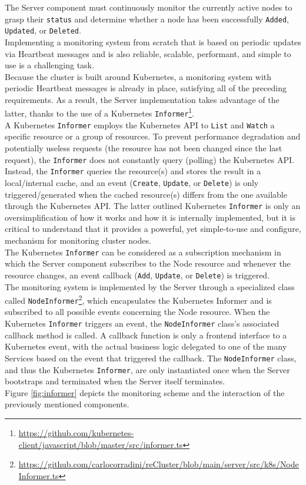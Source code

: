 The Server component must continuously monitor the currently active nodes to
grasp their \texttt{status} and determine whether a node has been successfully \texttt{Added},
\texttt{Updated}, or \texttt{Deleted}. \\ %
Implementing a monitoring system from scratch that is based on periodic updates
via Heartbeat messages and is also reliable, scalable, performant, and simple to
use is a challenging task. \\ %
Because the cluster is built around Kubernetes, a monitoring system with
periodic Heartbeat messages is already in place, satisfying all of the preceding
requirements. As a result, the Server implementation takes advantage of the latter,
thanks to the use of a Kubernetes \texttt{Informer}\footnote{\url{https://github.com/kubernetes-client/javascript/blob/master/src/informer.ts}}.
\\ %
A Kubernetes \texttt{Informer} employs the Kubernetes API to \texttt{List} and \texttt{Watch}
a specific resource or a group of resources. To prevent performance degradation and
potentially useless requests (the resource has not been changed since the last
request), the \texttt{Informer} does not constantly query (polling) the Kubernetes
API. Instead, the \texttt{Informer} queries the resource(s) and stores the result
in a local/internal cache, and an event (\texttt{Create}, \texttt{Update}, or \texttt{Delete})
is only triggered/generated when the cached resource(s) differs from the one
available through the Kubernetes API. The latter outlined Kubernetes \texttt{Informer}
is only an oversimplification of how it works and how it is internally
implemented, but it is critical to understand that it provides a powerful, yet
simple-to-use and configure, mechanism for monitoring cluster nodes. \\ %
The Kubernetes \texttt{Informer} can be considered as a subscription mechanism
in which the Server component subscribes to the Node resource and whenever the
resource changes, an event callback (\texttt{Add}, \texttt{Update}, or \texttt{Delete})
is triggered. \\ %
The monitoring system is implemented by the Server through a specialized class
called \texttt{NodeInformer}\footnote{\url{https://github.com/carlocorradini/reCluster/blob/main/server/src/k8s/NodeInformer.ts}},
which encapsulates the Kubernetes Informer and is subscribed to all possible
events concerning the Node resource. When the Kubernetes \texttt{Informer}
triggers an event, the \texttt{NodeInformer} class's associated callback method
is called. A callback function is only a frontend interface to a Kubernetes event,
with the actual business logic delegated to one of the many Services based on
the event that triggered the callback. The \texttt{NodeInformer} class, and thus
the Kubernetes \texttt{Informer}, are only instantiated once when the Server bootstraps
and terminated when the Server itself terminates. \\ %
Figure \ref{fig:informer} depicts the monitoring scheme and the interaction of the
previously mentioned components.

